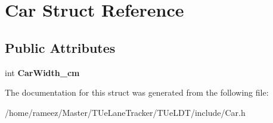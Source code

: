 \hypertarget{structCar}{\section{Car Struct Reference}
\label{structCar}
}
\subsection*{Public Attributes}
\begin{DoxyCompactItemize}
\item 
\hypertarget{structCar_ab939dc98da9e2bcdc07763489903236e}{int {\bfseries Car\-Width\-\_\-cm}}\label{structCar_ab939dc98da9e2bcdc07763489903236e}

\end{DoxyCompactItemize}


The documentation for this struct was generated from the following file\-:\begin{DoxyCompactItemize}
\item 
/home/rameez/\-Master/\-T\-Ue\-Lane\-Tracker/\-T\-Ue\-L\-D\-T/include/Car.\-h\end{DoxyCompactItemize}
